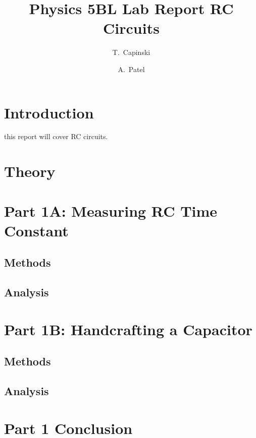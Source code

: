 \documentclass[11pt]{article}
\title{Physics 5BL Lab Report RC Circuits}
\author{T.~Capinski \and A.~Patel}
\let\oldsection\section
\renewcommand\section{\clearpage\oldsection}
\begin{document}
    \maketitle
    \tableofcontents

    \section*{Introduction}\label{sec:introduction}
    this report will cover RC circuits.









    \section*{Theory}\label{sec:theory}









    \section{Part 1A: Measuring RC Time Constant}\label{sec:part1a_time_constant}
    \subsection{Methods}\label{subsec:part1a_methods}
    \subsection{Analysis}\label{subsec:part1a_analysis}

    \section{Part 1B: Handcrafting a Capacitor}\label{sec:part1b_capacitor}
    \subsection{Methods}\label{subsec:part1b_methods}
    \subsection{Analysis}\label{subsec:part1b_analysis}

    \section{Part 1 Conclusion}\label{sec:part1_conclusion}
\end{document}
